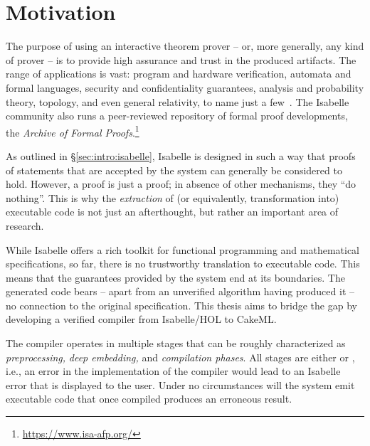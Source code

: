 
\section{Motivation}
\label{sec:intro:motivation}

The purpose of using an interactive theorem prover -- or, more generally, any kind of prover -- is to provide high assurance and trust in the produced artifacts.
The range of applications is vast: program and hardware verification, automata and formal languages, security and confidentiality guarantees, analysis and probability theory, topology, and even general relativity, to name just a few~\cite{avigad2018milestones}.
The Isabelle community also runs a peer-reviewed repository of formal proof developments, the \emph{Archive of Formal Proofs}.\footnote{\url{https://www.isa-afp.org/}}

As outlined in §\ref{sec:intro:isabelle}, Isabelle is designed in such a way that proofs of statements that are accepted by the system can generally be considered to hold.
However, a proof is just a proof; in absence of other mechanisms, they ``do nothing''.
This is why the \emph{extraction} of (or equivalently, transformation into) executable code is not just an afterthought, but rather an important area of research.

While Isabelle offers a rich toolkit for functional programming and mathematical specifications, so far, there is no trustworthy translation to executable code.
This means that the guarantees provided by the system end at its boundaries.
The generated code bears -- apart from an unverified algorithm having produced it -- no connection to the original specification.
This thesis aims to bridge the gap by developing a verified compiler from Isabelle/HOL to CakeML.

The compiler operates in multiple stages that can be roughly characterized as \emph{preprocessing,} \emph{deep embedding,} and \emph{compilation phases}.
All stages are either  or , i.e., an error in the implementation of the compiler would lead to an Isabelle error that is displayed to the user.
Under no circumstances will the system emit executable code that once compiled produces an erroneous result.